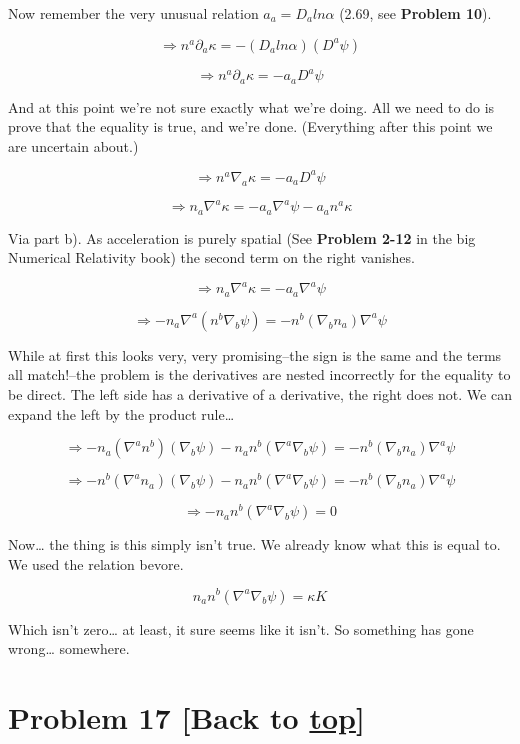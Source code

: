 \documentclass[landscape,letterpaper,10pt,english]{article}
\begin{document}
Now remember the very unusual relation \(a_a = D_a ln\alpha\) (2.69, see
\textbf{Problem 10}).

\[ \Rightarrow n^a \partial_a \kappa = - (D_a ln\alpha) (D^a \psi) \]

\[ \Rightarrow n^a \partial_a \kappa = - a_a D^a \psi \]

And at this point we're not sure exactly what we're doing. All we need
to do is prove that the equality is true, and we're done. (Everything
after this point we are uncertain about.)

    \[ \Rightarrow n^a \nabla_a \kappa = - a_a D^a \psi \]

\[ \Rightarrow n_a \nabla^a \kappa = - a_a \nabla^a \psi - a_an^a\kappa\]

Via part b). As acceleration is purely spatial (See \textbf{Problem
2-12} in the big Numerical Relativity book) the second term on the right
vanishes.

\[ \Rightarrow n_a \nabla^a \kappa = - a_a \nabla^a \psi\]

\[ \Rightarrow -n_a \nabla^a (n^b\nabla_b \psi) = - n^b (\nabla_b n_a) \nabla^a \psi\]

While at first this looks very, very promising--the sign is the same and
the terms all match!--the problem is the derivatives are nested
incorrectly for the equality to be direct. The left side has a
derivative of a derivative, the right does not. We can expand the left
by the product rule\ldots{}

\[ \Rightarrow -n_a (\nabla^a n^b)(\nabla_b \psi) -n_a n^b (\nabla^a\nabla_b \psi) = - n^b (\nabla_b n_a) \nabla^a \psi\]

\[ \Rightarrow -n^b (\nabla^a n_a)(\nabla_b \psi) -n_a n^b (\nabla^a\nabla_b \psi) = - n^b (\nabla_b n_a) \nabla^a \psi\]

\[ \Rightarrow  -n_a n^b (\nabla^a\nabla_b \psi) = 0\]

    Now\ldots{} the thing is this simply isn't true. We already know what
this is equal to. We used the relation bevore.

\[ n_a n^b (\nabla^a\nabla_b \psi) = \kappa K\]

Which isn't zero\ldots{} at least, it sure seems like it isn't. So
something has gone wrong\ldots{} somewhere.

    \hypertarget{problem-17-back-to-top}{%
\section{\texorpdfstring{Problem 17 {[}Back to
\hyperref[toc]{top}{]}}{Problem 17 {[}Back to {]}}}\label{problem-17-back-to-top}}
\end{document}
